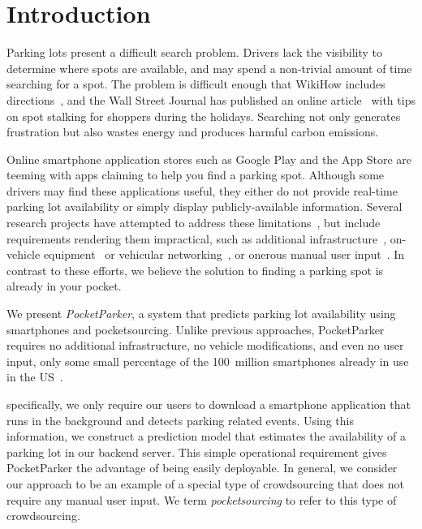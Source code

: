 \section{Introduction}

Parking lots present a difficult search problem. Drivers lack the visibility
to determine where spots are available, and may spend a non-trivial amount of
time searching for a spot. The problem is difficult enough that WikiHow
includes directions~\cite{wikihow-park}, and the Wall Street Journal has
published an online article~\cite{wsj-park} with tips on spot stalking for
shoppers during the holidays. Searching not only generates frustration but
also wastes energy and produces harmful carbon emissions.

Online smartphone application stores such as Google Play and the App Store
are teeming with apps claiming to help you find a parking spot. Although some
drivers may find these applications useful, they either do not provide
real-time parking lot availability or simply display publicly-available
information. Several research projects have attempted to address these
limitations~\cite{4212497, Chen:2012:COS, Delot:2009:CRP, 5062057,
Mathur:2010:PDS}, but include requirements rendering them impractical, such
as additional infrastructure~\cite{5062057}, on-vehicle
equipment~\cite{Mathur:2010:PDS} or vehicular
networking~\cite{Delot:2009:CRP, Mathur:2010:PDS}, or onerous manual user
input~\cite{Chen:2012:COS}. In contrast to these efforts, we believe the
solution to finding a parking spot is already in your pocket.

We present \textit{PocketParker}, a system that predicts parking lot
availability using smartphones and pocketsourcing. Unlike previous
approaches, PocketParker requires no additional infrastructure, no vehicle
modifications, and even no user input, only some small percentage of the
100~million smartphones already in use in the US~\cite{smartphone-numbers}.

specifically, we only require our users to download a smartphone application
that runs in the background and detects parking related events. Using this
information, we construct a prediction model that estimates the availability
of a parking lot in our backend server. This simple operational requirement
gives PocketParker the advantage of being easily deployable. In general, we
consider our approach to be an example of a special type of crowdsourcing
that does not require any manual user input. We term {\it pocketsourcing} to
refer to this type of crowdsourcing.

